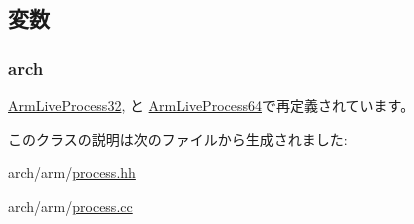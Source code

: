 \subsection{変数}
\hypertarget{classArmLiveProcess_abf93aa1dd69df35e2a50f63d5a5d4c40}{
\subsubsection[{arch}]{ {\bf arch}}}
\label{classArmLiveProcess_abf93aa1dd69df35e2a50f63d5a5d4c40}


\hyperlink{classArmLiveProcess32_abf93aa1dd69df35e2a50f63d5a5d4c40}{ArmLiveProcess32}, と \hyperlink{classArmLiveProcess64_abf93aa1dd69df35e2a50f63d5a5d4c40}{ArmLiveProcess64}で再定義されています。

このクラスの説明は次のファイルから生成されました:\begin{DoxyCompactItemize}
\item 
arch/arm/\hyperlink{arch_2arm_2process_8hh}{process.hh}\item 
arch/arm/\hyperlink{arch_2arm_2process_8cc}{process.cc}\end{DoxyCompactItemize}
